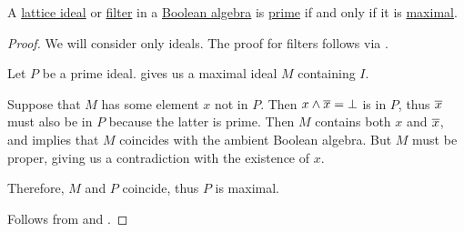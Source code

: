 \begin{proposition}\label{thm:boolean_prime_iff_maximal}
  A \hyperref[def:lattice_ideal]{lattice ideal} or \hyperref[def:lattice_ideal]{filter} in a \hyperref[def:boolean_algebra]{Boolean algebra} is \hyperref[def:lattice_ideal/prime]{prime} if and only if it is \hyperref[def:lattice_ideal/maximal]{maximal}.
\end{proposition}
\begin{proof}
  We will consider only ideals. The proof for filters follows via .

  \SufficiencySubProof Let \( P \) be a prime ideal.  gives us a maximal ideal \( M \) containing \( I \).

  Suppose that \( M \) has some element \( x \) not in \( P \). Then \( x \wedge \oline x = \bot \) is in \( P \), thus \( \oline x \) must also be in \( P \) because the latter is prime. Then \( M \) contains both \( x \) and \( \oline x \), and  implies that \( M \) coincides with the ambient Boolean algebra. But \( M \) must be proper, giving us a contradiction with the existence of \( x \).

  Therefore, \( M \) and \( P \) coincide, thus \( P \) is maximal.

  \NecessitySubProof Follows from  and .
\end{proof}

